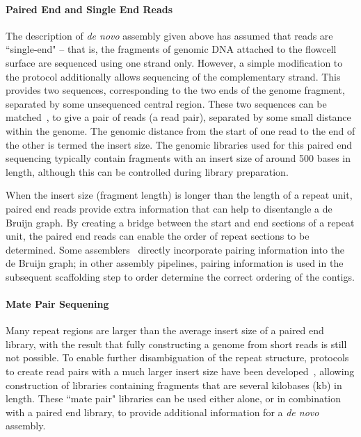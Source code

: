 \paragraph{Paired End and Single End Reads}
The description of \textit{de novo} assembly given above has assumed that reads are ``single-end" -- that is, the fragments of genomic DNA attached to the flowcell surface are sequenced using one strand only. However, a simple modification to the protocol additionally allows sequencing of the complementary strand. This provides two sequences, corresponding to the two ends of the genome fragment, separated by some unsequenced central region. These two sequences can be matched~\cite{edwards1990}, to give a pair of reads (a read pair), separated by some small distance within the genome. The genomic distance from the start of one read to the end of the other is termed the insert size. The genomic libraries used for this paired end sequencing typically contain fragments with an insert size of around 500 bases in length, although this can be controlled during library preparation.

When the insert size (fragment length) is longer than the length of a repeat unit, paired end reads provide extra information that can help to disentangle a de Bruijn graph. By creating a bridge between the start and end sections of a repeat unit, the paired end reads can enable the order of repeat sections to be determined. Some assemblers~\cite{medvedev2011, Bankevich2012} directly incorporate pairing information into the de Bruijn graph; in other assembly pipelines, pairing information is used in the subsequent  scaffolding step to order determine the correct ordering of the contigs.  

\paragraph{Mate Pair Sequening}
Many repeat regions are larger than the average insert size of a paired end library, with the result that fully constructing a genome from short reads is still not possible. To enable further disambiguation of the repeat structure, protocols to create read pairs with a much larger insert size have been developed~\cite{nextera2012}, allowing construction of libraries containing fragments that are several kilobases (kb) in length. These ``mate pair" libraries can be used either alone, or in combination with a paired end library, to provide additional information for a \textit{de novo} assembly.

